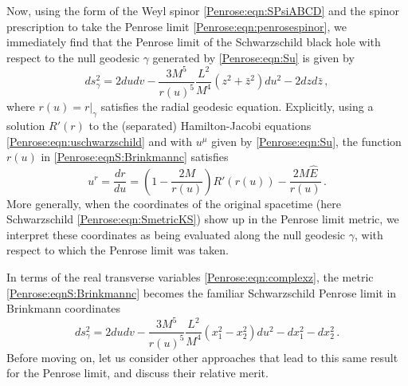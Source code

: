 Now, using the form of the Weyl spinor \eqref{Penrose:eqn:SPsiABCD} and the spinor prescription to take the Penrose limit \eqref{Penrose:eqn:penrosespinor}, we immediately find that the Penrose limit of the Schwarzschild black hole with respect to the null geodesic $\gamma$ generated by \eqref{Penrose:eqn:Su} is given by
\begin{equation}\label{Penrose:eqnS:Brinkmannc}
ds_{\gamma}^2 = 2 du dv - \frac{3 M^5}{r(u)^5} \frac{L^2}{M^4}\left(z^2 + \bar{z}^2\right) du^2 - 2 dz d\bar{z}  \, ,
\end{equation}
where $r(u) = r|_{\gamma}$ satisfies the radial geodesic equation. Explicitly, using a solution $R'(r)$ to the (separated) Hamilton-Jacobi equations \eqref{Penrose:eqn:uschwarzschild} and with $u^{\mu}$ given by \eqref{Penrose:eqn:Su}, the function $r(u)$ in \eqref{Penrose:eqnS:Brinkmannc} satisfies
\begin{equation}\label{Penrose:eqn:Srgeod}
u^r = \frac{dr}{du} = \left(1-\frac{2M}{r(u)}\right)R'(r(u)) - \frac{2M \hat{E}}{r(u)} \, .
\end{equation}
More generally, when the coordinates of the original spacetime (here Schwarzschild \eqref{Penrose:eqn:SmetricKS}) show up in the Penrose limit metric, we interpret these coordinates as being evaluated along the null geodesic $\gamma$, with respect to which the Penrose limit was taken.

In terms of the real transverse variables \eqref{Penrose:eqn:complexz}, the metric \eqref{Penrose:eqnS:Brinkmannc} becomes the familiar Schwarzschild Penrose limit in Brinkmann coordinates \cite{blau2011plane}
\begin{equation}\label{Penrose:eqnS:Brinkmann}
ds_{\gamma}^2 = 2 du dv - \frac{3 M^5}{r(u)^5} \frac{L^2}{M^4}\left(x_1^2-x_2^2\right) du^2 - dx_1^2 - dx_2^2 \, .
\end{equation}
Before moving on, let us consider other approaches that lead to this same result for the Penrose limit, and discuss their relative merit.

